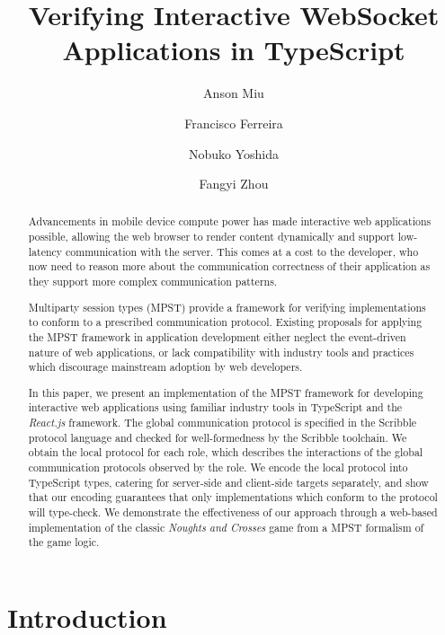 \documentclass[submission,copyright,creativecommons]{eptcs}
\title{Verifying Interactive WebSocket Applications in TypeScript}
\author{Anson Miu
\institute{Imperial College London}
\and
Francisco Ferreira
\institute{Imperial College London}
\and
Nobuko Yoshida
\institute{Imperial College London}
\and
Fangyi Zhou
\institute{Imperial College London}
}
\begin{document}
\maketitle

\begin{abstract}
Advancements in mobile device compute power has made interactive web applications possible, allowing the web browser to render content dynamically and support low-latency communication with the server. This comes at a cost to the developer, who now need to reason more about the communication correctness of their application as they support more complex communication patterns. 

Multiparty session types (MPST) provide a framework for verifying implementations to conform to a prescribed communication protocol. Existing proposals for applying the MPST framework in application development either neglect the event-driven nature of web applications, or lack compatibility with industry tools and practices which discourage mainstream adoption by web developers.

In this paper, we present an implementation of the MPST framework for developing interactive web applications using familiar industry tools in TypeScript and the \textit{React.js} framework. The global communication protocol is specified in the Scribble protocol language and checked for well-formedness by the Scribble toolchain. We obtain the local protocol for each role, which describes the interactions of the global communication protocols observed by the role. We encode the local protocol into TypeScript types, catering for server-side and client-side targets separately, and show that our encoding guarantees that only implementations which conform to the protocol will type-check. We demonstrate the effectiveness of our approach through a web-based implementation of the classic \textit{Noughts and Crosses} game from a MPST formalism of the game logic.

\end{abstract}

\section{Introduction}
\end{document}
